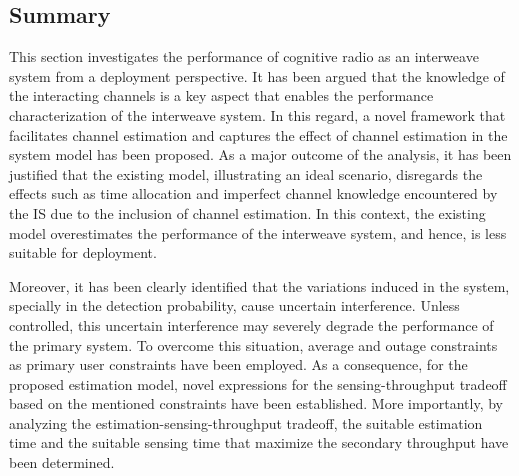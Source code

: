 {%

\subsection{Summary}
This section investigates the performance of cognitive radio as an interweave system from a deployment perspective. It has been argued that the knowledge of the interacting channels is a key aspect that enables the performance characterization of the interweave system. In this regard, a novel framework that facilitates channel estimation and captures the effect of channel estimation in the system model has been proposed. As a major outcome of the analysis, it has been justified that the existing model, illustrating an ideal scenario, disregards the effects such as time allocation and imperfect channel knowledge encountered by the IS due to the inclusion of channel estimation. In this context, the existing model overestimates the performance of the interweave system, and hence, is less suitable for deployment.

Moreover, it has been clearly identified that the variations induced in the system, specially in the detection probability, cause uncertain interference. Unless controlled, this uncertain interference may severely degrade the performance of the primary system. To overcome this situation, average and outage constraints as primary user constraints have been employed. As a consequence, for the proposed estimation model, novel expressions for the sensing-throughput tradeoff based on the mentioned constraints have been established. More importantly, by analyzing the estimation-sensing-throughput tradeoff, the suitable estimation time and the suitable sensing time that maximize the secondary throughput have been determined.

}
